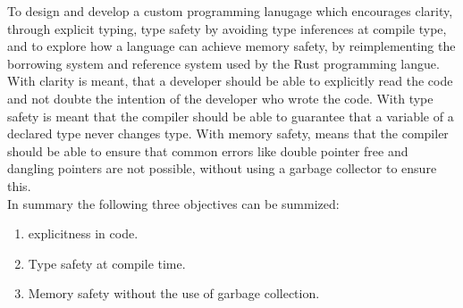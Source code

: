 To design and develop a custom programming lanugage which encourages clarity, through
explicit typing, type safety by avoiding type inferences at compile type, and to
explore how a language can achieve memory safety, by reimplementing the borrowing
system and reference system used by the Rust programming langue\cite{RUST}. \\

With clarity is meant, that a developer should be able to explicitly read the code
and not doubte the intention of the developer who wrote the code. With type safety is
meant that the compiler should be able to guarantee that a variable of a declared
type never changes type. With memory safety, means that the compiler should be able to
ensure that common errors like double pointer free and dangling pointers are not
possible, without using a garbage collector to ensure this. \\ 

In summary the following three objectives can be summized:

\begin{enumerate}
  \item explicitness in code.
  \item Type safety at compile time.
  \item Memory safety without the use of garbage collection.
\end{enumerate}
